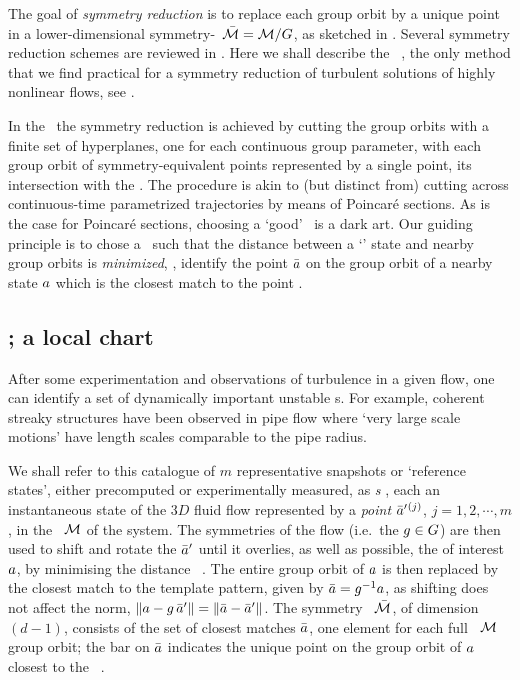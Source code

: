 \documentclass{jfm}
\begin{document}
The goal of \emph{symmetry reduction} is to replace each group orbit by a
unique point in a lower-dimensional symmetry-\reducedsp\ $\pSRed =
\pS/\Group$, as sketched in . Several symmetry
reduction schemes are reviewed in . Here we shall
describe the \mslices\ \citep{rowley_reconstruction_2000,BeTh04,FrCv11}, the
only method that we find practical for a symmetry reduction of
turbulent solutions of highly nonlinear flows, see .

In the \mslices\ the symmetry reduction is achieved by cutting the group
orbits with a finite set of hyperplanes, one for each continuous group
parameter, with each group orbit of
symmetry-equivalent points represented by a single point, its
intersection with the \slice.
The procedure is akin to (but distinct from)
cutting across continuous-time parametrized trajectories by
means of Poincar\'e sections.
As is the case for Poincar\'e sections,
choosing a `good' \slice\ is a dark art. Our guiding principle is to chose
a \slice\ such that the distance between a `{\template}' state {\slicep} and nearby
group orbits is \emph{minimized}, \ie, identify the point $\bar{a}$ on the group
orbit  of a nearby state $a$ which is the closest
match to the {\template} point {\slicep}.


\subsection{\Mslices; a local chart}

After some experimentation and observations of turbulence in a given
flow, one can identify a set of dynamically important unstable
{\recurrStr s}.  For example, coherent streaky structures have been
observed in pipe flow where `very large scale motions' have
length scales comparable to the pipe radius.

We shall refer to this catalogue of $m$ representative snapshots
or `reference states', either precomputed or
experimentally measured, as  \emph{\template s}
\citep{rowley_reconstruction_2000}, each an instantaneous state of the
$3D$ fluid flow represented by a
\emph{point} $\bar{a}'{}^{(j)}$, $j=1,2,\cdots,m$, in the
\statesp\ $\pS$ of the system. The symmetries of the flow (i.e.\ the
$g\in G$) are then used to shift and rotate the {\template}
$\bar{a}'$ until it overlies, as well as possible, the {\cohStr} of
interest $a$, by minimising the distance
\beq
\Norm{\ssp - \LieEl(\gSpace)\,\slicep}
\, .
The entire group orbit of $a$ is then replaced
by the closest match to
the template pattern,
given by
$\bar{a}=g^{-1}a$, %
as shifting does not affect the norm,
$\|{a-g\,\bar{a}'}\|=\|{\bar{a}-\bar{a}'}\|$.
The symmetry \reducedsp\ $\pSRed$, of dimension $(d\!-\!1)$, consists of
the set of closest matches $\bar{a}$, one element for each full \statesp\ $\pS$
group orbit; the bar on $\bar{a}$
indicates the unique point on the group orbit of $a$ closest to
the \template\ \slicep.
\end{document}
